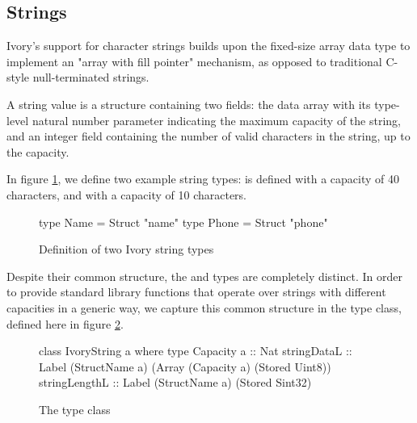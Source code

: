
\subsection{Strings}
Ivory's support for character strings builds upon the fixed-size array
data type to implement an "array with fill pointer" mechanism, as opposed
to traditional C-style null-terminated strings.

A string value is a structure containing two fields: the data array
with its type-level natural number parameter indicating the maximum
capacity of the string, and an integer field containing the number of
valid characters in the string, up to the capacity.

In figure \ref{ivory-string-type-defn}, we define two example
string types:  is defined with a capacity of 40
characters, and  with a capacity of 10 characters.

\begin{figure}[h]
\begin{code}

type Name  = Struct "name"
type Phone = Struct "phone"
\end{code}
\caption{Definition of two Ivory string types}
\label{ivory-string-type-defn}
\end{figure}

Despite their common structure, the  and  types
are completely distinct. In order to provide standard library
functions that operate over strings with different capacities in a generic
way, we capture this common structure in the  type
class, defined here in figure \ref{ivory-string-class}.

\begin{figure}[h]
\begin{code}
class IvoryString a where
  type Capacity a :: Nat
  stringDataL   :: Label (StructName a)
                         (Array (Capacity a)
                                (Stored Uint8))
  stringLengthL :: Label (StructName a)
                         (Stored Sint32)
\end{code}
\caption{The  type class}
\label{ivory-string-class}
\end{figure}

